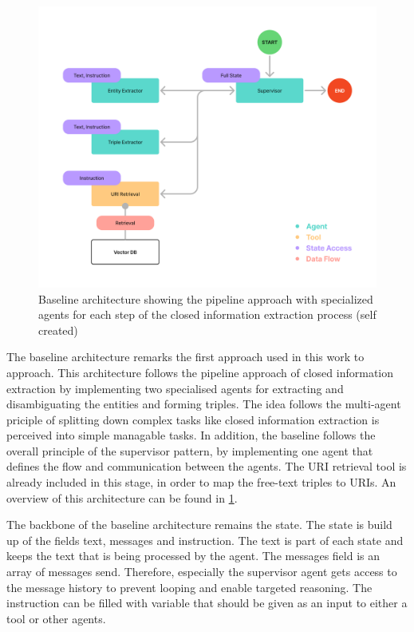 \documentclass[a4paper,oneside,bibliography=totoc]{scrbook}
\begin{document}
\begin{figure}[h]
  \centering
  \includegraphics[width=\textwidth]{figures/Baseline Architecture.png}
  \caption{Baseline architecture showing the pipeline approach with specialized agents for each step of the closed information extraction process (self created)}
  \label{fig:baseline_architecture}
\end{figure}

The baseline architecture remarks the first approach used in this work to approach. This architecture follows the pipeline approach of closed information extraction by implementing two specialised agents for extracting and disambiguating the entities and forming triples. The idea follows the multi-agent priciple of splitting down complex tasks like closed information extraction is perceived \cite{Josifoski2021} into simple managable tasks. In addition, the baseline follows the overall principle of the supervisor pattern, by implementing one agent that defines the flow and communication between the agents. The URI retrieval tool is already included in this stage, in order to map the free-text triples to URIs. An overview of this architecture can be found in \ref{fig:baseline_architecture}.

The backbone of the baseline architecture remains the state. The state is build up of the fields text, messages and instruction. The text is part of each state and keeps the text that is being processed by the agent. The messages field is an array of messages send. Therefore, especially the supervisor agent gets access to the message history to prevent looping and enable targeted reasoning. The instruction can be filled with variable that should be given as an input to either a tool or other agents.
\end{document}
